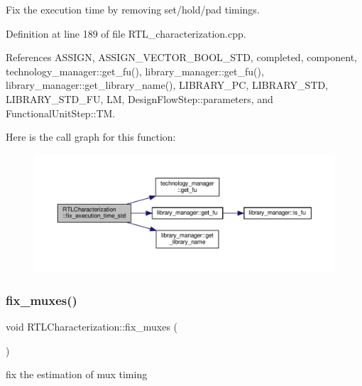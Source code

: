 Fix the execution time by removing set/hold/pad timings. 



Definition at line 189 of file R\+T\+L\+\_\+characterization.\+cpp.



References A\+S\+S\+I\+GN, A\+S\+S\+I\+G\+N\+\_\+\+V\+E\+C\+T\+O\+R\+\_\+\+B\+O\+O\+L\+\_\+\+S\+TD, completed, component, technology\+\_\+manager\+::get\+\_\+fu(), library\+\_\+manager\+::get\+\_\+fu(), library\+\_\+manager\+::get\+\_\+library\+\_\+name(), L\+I\+B\+R\+A\+R\+Y\+\_\+\+PC, L\+I\+B\+R\+A\+R\+Y\+\_\+\+S\+TD, L\+I\+B\+R\+A\+R\+Y\+\_\+\+S\+T\+D\+\_\+\+FU, LM, Design\+Flow\+Step\+::parameters, and Functional\+Unit\+Step\+::\+TM.

Here is the call graph for this function\+:
\nopagebreak
\begin{figure}[H]
\begin{center}
\leavevmode
\includegraphics[width=350pt]{d9/d84/classRTLCharacterization_aac3182b7f98299ce58876579de647ad3_cgraph}
\end{center}
\end{figure}
\mbox{\label{classRTLCharacterization_a5f3dcbe12f62ab3c698e9802d9caf145}} 
\subsubsection{\texorpdfstring{fix\+\_\+muxes()}{fix\_muxes()}}
{\footnotesize\ttfamily void R\+T\+L\+Characterization\+::fix\+\_\+muxes (\begin{DoxyParamCaption}{ }\end{DoxyParamCaption})\hspace{0.3cm}{\ttfamily [private]}}



fix the estimation of mux timing 



